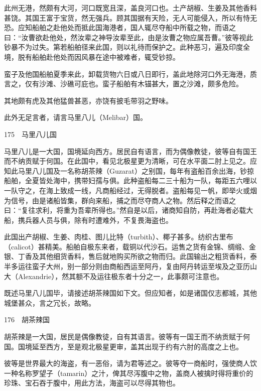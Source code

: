 \documentclass[12pt,UTF8]{ctexbook}
\begin{document}
此州无港，然颇有大河，河口既宽且深，盖良河口也。土产胡椒、生姜及其他香料甚饶。其国王富于宝货，然无强兵。顾其国据有天险，无人可能侵入，所以有恃无恐。应知船舶之赴他处而抵此国海港者，国人辄尽夺船中所载之物，而语之曰：“汝曹欲赴他处，然汝辈之神导汝辈至此，由是汝曹之物应属吾曹。”彼等视此钞暴不为过失。第若船舶径来此国，则以礼待而保护之。此种恶习，遍及印度全境，脱有船舶赴他处而因风暴在途中被难者，辄受钞掠。

蛮子及他国船舶夏季来此，卸载货物六日或八日即行，盖此地除河口外无海港，质言之，仅有沙滩、沙礁可庇也。蛮子船舶有木锚甚大，置之沙滩，颇多危险。

其地颇有虎及其他猛兽甚恶，亦饶有披毛带羽之野味。

此外无足言者，请言马里八儿（Melibar）国。





175　马里八儿国

马里八儿是一大国，国境延向西方。居民自有语言，而为偶像教徒，彼等自有国王而不纳贡赋于何国。在此国中，看见北极星更为清晰，可在水平面二肘上见之。应知此马里八儿国及一名称胡茶辣（Guzarat）之别国，每年有盗船百余出海，钞掠船舶，全夏皆处海中，携带妇孺与俱。此种盗船每二三十船为一队，每距五六哩以一队守之，在海上致成一线，凡商船经过，无得脱者。盗船每见一帆，即举火或烟为信号，由是诸船皆集，群向来船，捕之而尽夺商人之物。然后释之而语之曰：“复往求利，将重为吾辈所得也。”然自是以后，诸商知自防，再赴海者必载大船，携兵器人员与俱，除有时遭难外，不复畏海盗也。

此国出产胡椒、生姜、肉桂、图儿比特（turbith）、椰子甚多。纺织古里布（calicot）甚精美。船舶自极东来者，载铜以代沙石。运售之货有金锦、绸缎、金银、丁香及其他细货香料，售后就地购买所欲之物而归。此国输出之粗货香料，泰半多运往蛮子大州，别一部分则由商船西运至阿丹，复由阿丹转运至埃及之亚历山大（Alexandrie），然其额不及运往极东者十分之一，此事颇可注意也。

既述马里八儿国毕，请接述胡茶辣国如下文。但应知者，如是诸国仅志都城，其他城堡甚众，言之冗长，故略。





176　胡茶辣国

胡茶辣是一大国，居民是偶像教徒，自有其语言。彼等有一国王而不纳贡赋于何国。国境延至西方，至是观北极星更审，盖其出现于约有六肘的高度之上也。

彼等是世界最大的海盗，有一恶俗，请为君等述之。彼等夺一商船时，强使商人饮一种名称罗望子（tamarin）之汁，俾其尽泻腹中之物，盖商人被擒时得将重价的珍珠、宝石吞于腹中，用此方法，海盗可以尽得其物也。
\end{document}
